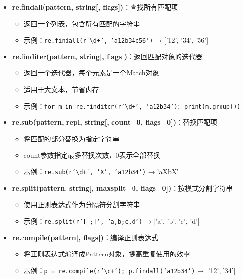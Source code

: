 \begin{mdframed}[linewidth=1pt, linecolor=black]
\begin{itemize}
    \item \textbf{re.findall(pattern, string[, flags])}：查找所有匹配项
      \begin{itemize}
        \item 返回一个列表，包含所有匹配的字符串
        \item 示例：\texttt{re.findall(r'\textbackslash d+', 'a12b34c56')} → ['12', '34', '56']
      \end{itemize}

    \item \textbf{re.finditer(pattern, string[, flags])}：返回匹配对象的迭代器
      \begin{itemize}
        \item 返回一个迭代器，每个元素是一个Match对象
        \item 适用于大文本，节省内存
        \item 示例：\texttt{for m in re.finditer(r'\textbackslash d+', 'a12b34'): print(m.group())}
      \end{itemize}

    \item \textbf{re.sub(pattern, repl, string[, count=0, flags=0])}：替换匹配项
      \begin{itemize}
        \item 将匹配的部分替换为指定字符串
        \item count参数指定最多替换次数，0表示全部替换
        \item 示例：\texttt{re.sub(r'\textbackslash d+', 'X', 'a12b34')} → 'aXbX'
      \end{itemize}

    \item \textbf{re.split(pattern, string[, maxsplit=0, flags=0])}：按模式分割字符串
      \begin{itemize}
        \item 使用正则表达式作为分隔符分割字符串
        \item 示例：\texttt{re.split(r'[,;]', 'a,b;c,d')} → ['a', 'b', 'c', 'd']
      \end{itemize}

    \item \textbf{re.compile(pattern[, flags])}：编译正则表达式
      \begin{itemize}
        \item 将正则表达式编译成Pattern对象，提高重复使用的效率
        \item 示例：\texttt{p = re.compile(r'\textbackslash d+'); p.findall('a12b34')} → ['12', '34']
      \end{itemize}
  \end{itemize}


\end{mdframed}
